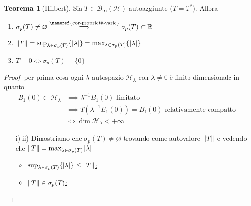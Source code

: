 \documentclass[a4paper,10pt]{article}
\theoremstyle{definition}
\newcommand{\re}{\mathbb{R}} %
\newcommand{\hil}{\mathcal{H}} %
\theoremstyle{indentdefinition}
\theoremstyle{indenttheorem}
\newtheorem{thm}{Teorema}
\theoremstyle{myremark}
\theoremstyle{indentgeneral}
\newenvironment{myboxed} 
{\noindent\begin{lrbox}{\mybox}\begin{minipage}{\textwidth}}
{\end{minipage}\end{lrbox}\fbox{\usebox{\mybox}}}
\begin{document}
\begin{myboxed}
    \begin{thm}[Hilbert] \label{thm-hilbert}
        Sia $T\in\mathcal{B}_\infty(\hil)$ autoaggiunto ($T=T^*$). Allora
        \begin{enumerate}
            \item $\sigma_p(T)\ne\varnothing \overset{\text{\nameref{cor-proprietà-varie}}}{\implies}\sigma_p(T)\subset\re$
            \item $\norm{T}=\sup_{\lambda\in\sigma_p(T)}\{\abs{\lambda}\}=\max_{\lambda\in\sigma_p(T)}\{\abs{\lambda}\}$
            \item $T=0\iff \sigma_p(T)=\{0\}$
        \end{enumerate}
    \end{thm}
\end{myboxed}
\begin{proof} per prima cosa ogni $\lambda$-autospazio $\hil_\lambda$ con $\lambda\ne 0$ è finito dimensionale in quanto 
\begin{align*}
    B_1(0)\subset\hil_\lambda &\implies \lambda^{-1}B_1(0) \text{ limitato}\\
    &\implies T(\lambda^{-1}B_1(0))=B_1(0) \text{ relativamente compatto}\\
    &\iff \dim\hil_\lambda<+\infty
\end{align*}
    \begin{itemize}
        \item[i)-ii)]  Dimostriamo che $\sigma_p(T)\ne\varnothing$ trovando come autovalore $\norm{T}$ e vedendo che $\norm{T}=\max_{\lambda\in\sigma_p(T)}\abs{\lambda}$
        \begin{itemize}
            \item \underline{$\sup_{\lambda\in\sigma_p(T)}\{\abs{\lambda}\}\le\norm{T}$:}
            \item \underline{$\norm{T}\in\sigma_p(T) $:}
        \end{itemize}
    \end{itemize}
    \todo{}
\end{proof}
\end{document}
